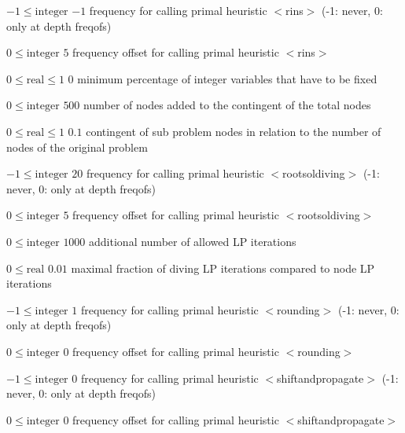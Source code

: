 %
{$-1\leq\textrm{integer}$}%
{$-1$}%
{frequency for calling primal heuristic $<$rins$>$ (-1: never, 0: only at depth freqofs)}%
{}

%
{$0\leq\textrm{integer}$}%
{$5$}%
{frequency offset for calling primal heuristic $<$rins$>$}%
{}

%
{$0\leq\textrm{real}\leq1$}%
{$0$}%
{minimum percentage of integer variables that have to be fixed}%
{}

%
{$0\leq\textrm{integer}$}%
{$500$}%
{number of nodes added to the contingent of the total nodes}%
{}

%
{$0\leq\textrm{real}\leq1$}%
{$0.1$}%
{contingent of sub problem nodes in relation to the number of nodes of the original problem}%
{}

%
{$-1\leq\textrm{integer}$}%
{$20$}%
{frequency for calling primal heuristic $<$rootsoldiving$>$ (-1: never, 0: only at depth freqofs)}%
{}

%
{$0\leq\textrm{integer}$}%
{$5$}%
{frequency offset for calling primal heuristic $<$rootsoldiving$>$}%
{}

%
{$0\leq\textrm{integer}$}%
{$1000$}%
{additional number of allowed LP iterations}%
{}

%
{$0\leq\textrm{real}$}%
{$0.01$}%
{maximal fraction of diving LP iterations compared to node LP iterations}%
{}

%
{$-1\leq\textrm{integer}$}%
{$1$}%
{frequency for calling primal heuristic $<$rounding$>$ (-1: never, 0: only at depth freqofs)}%
{}

%
{$0\leq\textrm{integer}$}%
{$0$}%
{frequency offset for calling primal heuristic $<$rounding$>$}%
{}

%
{$-1\leq\textrm{integer}$}%
{$0$}%
{frequency for calling primal heuristic $<$shiftandpropagate$>$ (-1: never, 0: only at depth freqofs)}%
{}

%
{$0\leq\textrm{integer}$}%
{$0$}%
{frequency offset for calling primal heuristic $<$shiftandpropagate$>$}%
{}

